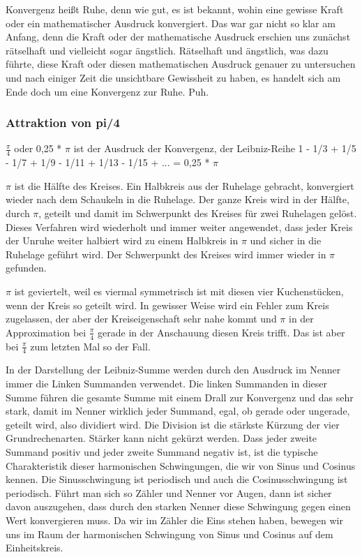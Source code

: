 \documentclass[a4paper, 12pt, twoside, openright]{report}
\theoremstyle{definition}
\theoremstyle{definition}
\begin{document}
Konvergenz heißt Ruhe, denn wie gut, es ist bekannt, wohin eine gewisse Kraft oder ein mathematischer Ausdruck konvergiert. Das war gar nicht so klar am Anfang, denn die Kraft oder der mathematische Ausdruck erschien uns zunächst rätselhaft und vielleicht sogar ängstlich. Rätselhaft und ängstlich, was dazu führte, diese Kraft oder diesen mathematischen Ausdruck genauer zu untersuchen und nach einiger Zeit die unsichtbare Gewissheit zu haben, es handelt sich am Ende doch um eine Konvergenz zur Ruhe. Puh.

\subsubsection{Attraktion von pi/4}

$\frac{\pi}{4}$ oder 0,25 * $\pi$ ist der Ausdruck der Konvergenz, der Leibniz-Reihe 1 - 1/3 + 1/5 - 1/7 + 1/9 - 1/11 + 1/13 - 1/15 + ... = 0,25 * $\pi$

$\pi$ ist die Hälfte des Kreises. Ein Halbkreis aus der Ruhelage gebracht, konvergiert wieder nach dem Schaukeln in die Ruhelage. Der ganze Kreis wird in der Hälfte, durch $\pi$, geteilt und damit im Schwerpunkt des Kreises für zwei Ruhelagen gelöst. Dieses Verfahren wird wiederholt und immer weiter angewendet, dass jeder Kreis der Unruhe weiter halbiert wird zu einem Halbkreis in $\pi$ und sicher in die Ruhelage geführt wird. Der Schwerpunkt des Kreises wird immer wieder in $\pi$ gefunden.

$\pi$ ist geviertelt, weil es viermal symmetrisch ist mit diesen vier Kuchenstücken, wenn der Kreis so geteilt wird. In gewisser Weise wird ein Fehler zum Kreis zugelassen, der aber der Kreiseigenschaft sehr nahe kommt und $\pi$ in der Approximation bei $\frac{\pi}{4}$ gerade in der Anschauung diesen Kreis trifft. Das ist aber bei $\frac{\pi}{4}$ zum letzten Mal so der Fall.

In der Darstellung der Leibniz-Summe werden durch den Ausdruck im Nenner immer die Linken Summanden verwendet. Die linken Summanden in dieser Summe führen die gesamte Summe mit einem Drall zur Konvergenz und das sehr stark, damit im Nenner wirklich jeder Summand, egal, ob gerade oder ungerade, geteilt wird, also dividiert wird. Die Division ist die stärkste Kürzung der vier Grundrechenarten. Stärker kann nicht gekürzt werden. Dass jeder zweite Summand positiv und jeder zweite Summand negativ ist, ist die typische Charakteristik dieser harmonischen Schwingungen, die wir von Sinus und Cosinus kennen. Die Sinusschwingung ist periodisch und auch die Cosinusschwingung ist periodisch. Führt man sich so Zähler und Nenner vor Augen, dann ist sicher davon auszugehen, dass durch den starken Nenner diese Schwingung gegen einen Wert konvergieren muss. Da wir im Zähler die Eins stehen haben, bewegen wir uns im Raum der harmonischen Schwingung von Sinus und Cosinus auf dem Einheitskreis. 
\end{document}
